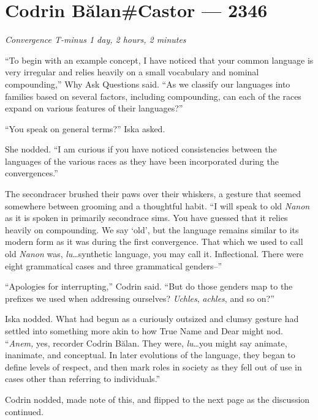 \hypertarget{codrin-bux103lancastor-2346}{%
\chapter{Codrin Bălan\#Castor — 2346}\label{codrin-bux103lancastor-2346}}

\begin{center}
\emph{Convergence T-minus 1 day, 2 hours, 2 minutes}
\end{center}

\noindent ``To begin with an example concept, I have noticed that your common language is very irregular and relies heavily on a small vocabulary and nominal compounding,'' Why Ask Questions said. ``As we classify our languages into families based on several factors, including compounding, can each of the races expand on various features of their languages?''

``You speak on general terms?'' Iska asked.

She nodded. ``I am curious if you have noticed consistencies between the languages of the various races as they have been incorporated during the convergences.''

The secondracer brushed their paws over their whiskers, a gesture that seemed somewhere between grooming and a thoughtful habit. ``I will speak to old \emph{Nanon} as it is spoken in primarily secondrace sims. You have guessed that it relies heavily on compounding. We say `old', but the language remains similar to its modern form as it was during the first convergence. That which we used to call old \emph{Nanon} was, \emph{lu}\ldots synthetic language, you may call it. Inflectional. There were eight grammatical cases and three grammatical genders--''

``Apologies for interrupting,'' Codrin said. ``But do those genders map to the prefixes we used when addressing ourselves? \emph{Uchles}, \emph{achles}, and so on?''

Iska nodded. What had begun as a curiously outsized and clumsy gesture had settled into something more akin to how True Name and Dear might nod. ``\emph{Anem,} yes, recorder Codrin Bălan. They were, \emph{lu}\ldots you might say animate, inanimate, and conceptual. In later evolutions of the language, they began to define levels of respect, and then mark roles in society as they fell out of use in cases other than referring to individuals.''

Codrin nodded, made note of this, and flipped to the next page as the discussion continued.

